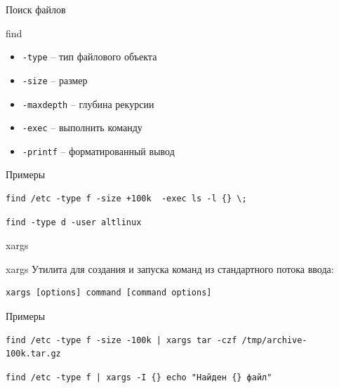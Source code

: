 \documentclass[ignorenonframetext, professionalfonts, hyperref={pdftex, unicode}]{beamer}
\begin{document}
\begin{frame}[fragile]{Поиск файлов}
	\begin{block}{find}
		\begin{itemize}
			\item {\tt -type} -- тип файлового объекта
			\item {\tt -size} -- размер
			\item {\tt -maxdepth} -- глубина рекурсии
			\item {\tt -exec} -- выполнить команду
			\item {\tt -printf} -- форматированный вывод
		\end{itemize}
	\end{block}

	\begin{block}{Примеры}
		\begin{verbatim}
find /etc -type f -size +100k  -exec ls -l {} \;
		\end{verbatim}

		\begin{verbatim}
find -type d -user altlinux
		\end{verbatim}
	
	\end{block}
\end{frame}

\begin{frame}[fragile]{xargs}
	\begin{block}{xargs}
			Утилита для создания и запуска команд из стандартного потока ввода:
		\begin{verbatim}
xargs [options] command [command options]
		\end{verbatim}
	
	\end{block}

	\begin{block}{Примеры}
		\begin{verbatim}
find /etc -type f -size -100k | xargs tar -czf /tmp/archive-100k.tar.gz
		\end{verbatim}

		\begin{verbatim}
find /etc -type f | xargs -I {} echo "Найден {} файл"
		\end{verbatim}
	
	\end{block}
\end{frame}
\end{document}
